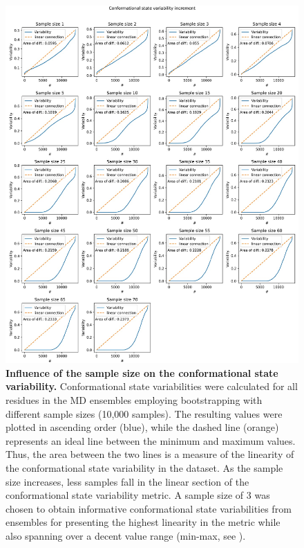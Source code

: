 \begin{figure}[H]
    \centering
    \includegraphics[width=0.9\linewidth]{constava//sup_figs/supfig2.pdf}
    \caption{\textbf{Influence of the sample size on the conformational state variability.} Conformational state variabilities were calculated for all residues in the MD ensembles employing bootstrapping with different sample sizes (10,000 samples). The resulting values were plotted in ascending order (blue), while the dashed line (orange) represents an ideal line between the minimum and maximum values. Thus, the area between the two lines is a measure of the linearity of the conformational state variability in the dataset. As the sample size increases, less samples fall in the linear section of the conformational state variability metric. A sample size of 3 was chosen to obtain informative conformational state variabilities from ensembles for presenting the highest linearity in the metric while also spanning over a decent value range (min-max, see ).}
    \label{fig:sup_fig_constava:sample_size}
\end{figure}

